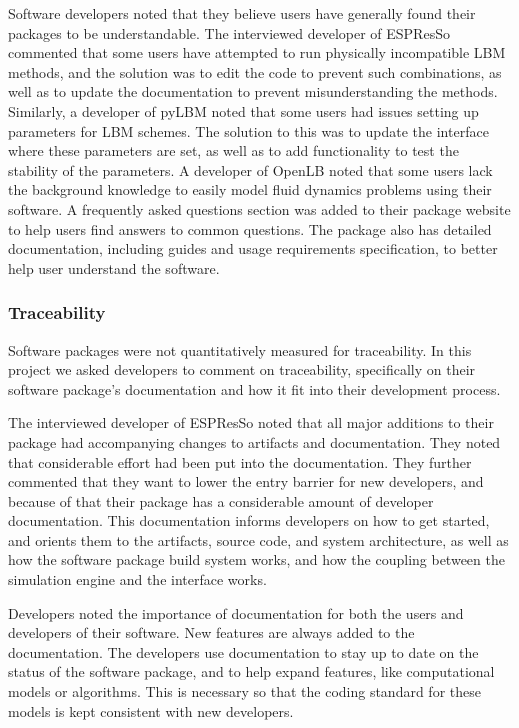 \documentclass[12pt, notitlepage]{article}
\begin{document}
Software developers noted that they believe users have generally found their packages to be understandable. The interviewed developer of ESPResSo commented that some users have attempted to run physically incompatible LBM methods, and the solution was to edit the code to prevent such combinations, as well as to update the documentation to prevent misunderstanding the methods. Similarly, a developer of pyLBM noted that some users had issues setting up parameters for LBM schemes. The solution to this was to update the interface where these parameters are set, as well as to add functionality to test the stability of the parameters. A developer of OpenLB noted that some users lack the background knowledge to easily model fluid dynamics problems using their software. A frequently asked questions section was added to their package website to help users find answers to common questions. The package also has detailed documentation, including guides and usage requirements specification, to better help user understand the software.

\subsubsection{Traceability}

Software packages were not quantitatively measured for traceability.
In this project we asked developers to comment on traceability, specifically on their software package's documentation and how it fit into their development process. 

The interviewed developer of ESPResSo noted that all major additions to their package had accompanying changes to artifacts and documentation. They noted that considerable effort had been put into the documentation. They further commented that they want to lower the entry barrier for new developers, and because of that their package has a considerable amount of developer documentation. This documentation informs developers on how to get started, and orients them to the artifacts, source code, and system architecture, as well as how the software package build system works, and how the coupling between the simulation engine and the interface works. 

Developers noted the importance of documentation for both the users and developers of their software. New features are always added to the documentation. The developers use documentation to stay up to date on the status of the software package, and to help expand features, like computational models or algorithms. This is necessary so that the coding standard for these models is kept consistent with new developers.
\end{document}
